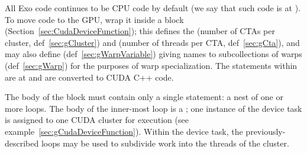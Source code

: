 All Exo code continues to be CPU code by default (we say that such code is at ).
To move code to the GPU, wrap it inside a  block (Section~\ref{sec:CudaDeviceFunction}); this defines the  (number of CTAs per cluster, def~\ref{sec:gCluster}) and  (number of threads per CTA, def~\ref{sec:gCta}), and may also define  (def~\ref{sec:gWarpVariable}) giving names to subcollections of warps (def~\ref{sec:gWarp}) for the purposes of warp specialization.
The statements within are at  and are converted to CUDA C++ code.

The body of the  block must contain only a single statement: a nest of one or more  loops.
The body of the inner-most  loop is a ; one instance of the device task is assigned to one CUDA cluster for execution (see example~\ref{sec:gCudaDeviceFunction}).
Within the device task, the previously-described  loops may be used to subdivide work into the threads of the cluster.

